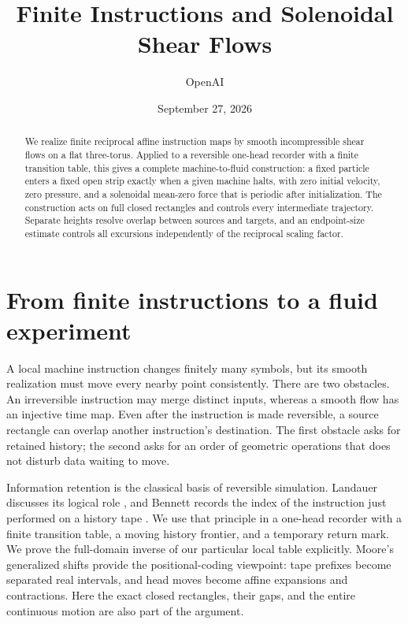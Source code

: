 \documentclass[11pt]{article}
\title{Finite Instructions and Solenoidal Shear Flows}
\author{OpenAI}
\date{September 27, 2026}
\theoremstyle{remark}
\begin{document}
\maketitle
\begin{abstract}
We realize finite reciprocal affine instruction maps by smooth incompressible
shear flows on a flat three-torus. Applied to a reversible one-head recorder
with a finite transition table, this gives a complete machine-to-fluid construction:
a fixed particle enters a fixed open strip exactly when a given machine halts,
with zero initial velocity, zero pressure, and a solenoidal mean-zero force
that is periodic after initialization. The construction acts on full closed
rectangles and controls every intermediate trajectory. Separate heights
resolve overlap between sources and targets, and an endpoint-size estimate
controls all excursions independently of the reciprocal scaling factor.
\end{abstract}

\section{From finite instructions to a fluid experiment}\label{sec:intro}
A local machine instruction changes finitely many symbols, but its smooth
realization must move every nearby point consistently. There are two obstacles.
An irreversible instruction may merge distinct inputs, whereas a smooth flow
has an injective time map. Even after the instruction is made reversible,
a source rectangle can overlap another instruction's destination. The first
obstacle asks for retained history; the second asks for an order of geometric
operations that does not disturb data waiting to move.

Information retention is the classical basis of reversible simulation.
Landauer discusses its logical role \cite[Section~3]{Landauer}, and Bennett
records the index of the instruction just performed on a history tape
\cite[Eqs.~(9)--(11)]{Bennett}. We use that principle in a one-head
recorder with a finite transition table, a moving history frontier, and a
temporary return mark. We prove the full-domain inverse of our particular
local table explicitly. Moore's generalized shifts \cite{Moore} provide the
positional-coding viewpoint: tape prefixes become separated real intervals,
and head moves become affine expansions and contractions. Here the exact
closed rectangles, their gaps, and the entire continuous motion are also
part of the argument.
\end{document}
